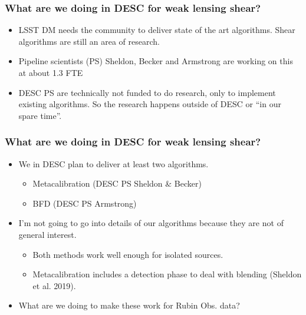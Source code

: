 \documentclass{beamer}
\begin{document}
\frame
{

    \frametitle{What are we doing in DESC for weak lensing shear?}


    \begin{itemize}

        \item LSST DM needs the community to deliver state of the art algorithms.
            Shear algorithms are still an area of research.

        \item Pipeline scientists (PS) Sheldon, Becker and Armstrong
            are working on this at about 1.3 FTE
            
        \item DESC PS are technically not funded to do research, only to
            implement existing algorithms.  So the research happens outside of
            DESC or ``in our spare time''.


    \end{itemize}

}

\frame
{

    \frametitle{What are we doing in DESC for weak lensing shear?}


    \begin{itemize}

        \item We in DESC plan to deliver at least two algorithms.

            \begin{itemize}
                \item Metacalibration (DESC PS Sheldon \& Becker)
                \item BFD (DESC PS Armstrong)
            \end{itemize}

        \item I'm not going to go into details of our algorithms because they
            are not of general interest.
            \begin{itemize}

                \item Both methods work well enough for isolated sources.
                    
                \item Metacalibration includes a detection phase to deal with
                    blending (Sheldon et al. 2019).
            \end{itemize}

        \item What are we doing to make these work for Rubin Obs. data?

    \end{itemize}

}
\end{document}
